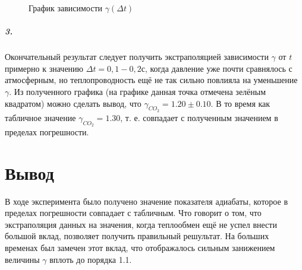 \documentclass[a4paper,12pt]{article}
\begin{document}
	\begin{figure}[h!]	\label{plan2}
	
	\caption{График зависимости $\gamma(\Delta t)$}
	
\end{figure}

\subparagraph*{3.} Окончательный результат следует получить экстраполяцией зависимости $\gamma$ от $t$ примерно к значению $\Delta t = 0,1 - 0,2 с$, когда давление уже почти сравнялось с атмосферным, но теплопроводность ещё не так сильно повлияла на уменьшение $\gamma$. Из полученного графика (на графике данная точка отмечена зелёным квадратом) можно сделать вывод, что $\gamma_{CO_2} = 1.20 \pm 0.10$. В то время как табличное значение $\gamma_{CO_2} = 1.30$, т. е. совпадает с полученным значением в пределах погрешности. 


	
	
\newpage
	
\section*{Вывод}


В ходе эксперимента было получено значение показателя адиабаты, которое в пределах погрешности совпадает с табличным. Что говорит о том, что экстраполяция данных на значения, когда теплообмен ещё не успел внести большой вклад, позволяет получить правильный решультат. На больших временах был замечен этот вклад, что отображалось сильным занижением величины $\gamma$ вплоть до порядка 1.1.
\end{document}
